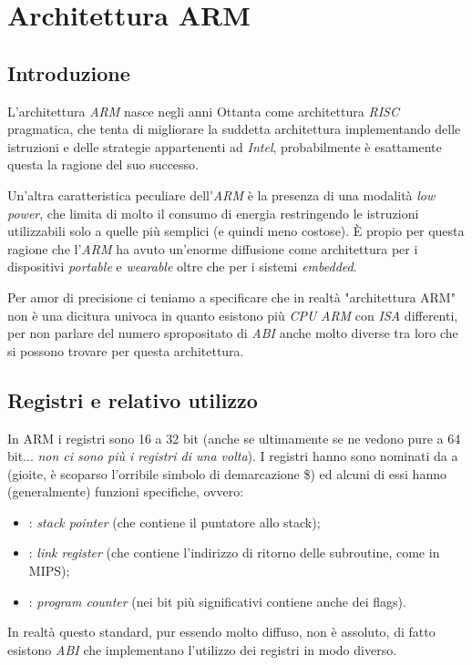 \documentclass[class=book, crop=false, oneside]{standalone}
\begin{document}
\chapter{Architettura ARM}

\section{Introduzione}
L'architettura \emph{ARM} nasce negli anni Ottanta come architettura \emph{RISC} pragmatica, che tenta di migliorare la suddetta architettura implementando delle istruzioni e delle strategie appartenenti ad \emph{Intel}, probabilmente è esattamente questa la ragione del suo successo.

Un'altra caratteristica peculiare dell'\emph{ARM} è la presenza di una modalità \emph{low power}, che limita di molto il consumo di energia restringendo le istruzioni utilizzabili solo a quelle più semplici (e quindi meno costose). È propio per questa ragione che l'\emph{ARM} ha avuto un'enorme diffusione come architettura per i dispositivi \emph{portable} e \emph{wearable} oltre che per i sistemi \emph{embedded}.

Per amor di precisione ci teniamo a specificare che in realtà "architettura ARM" non è una dicitura univoca in quanto esistono più \emph{CPU} \emph{ARM} con \emph{ISA} differenti, per non parlare del numero spropositato di \emph{ABI} anche molto diverse tra loro che si possono trovare per questa architettura.

\section{Registri e relativo utilizzo}
In ARM i registri sono 16 a 32 bit (anche se ultimamente se ne vedono pure a 64 bit... \emph{non ci sono più i registri di una volta}). I registri hanno sono nominati da  a  (gioite, è scoparso l'orribile simbolo di demarcazione \$) ed alcuni di essi hanno (generalmente) funzioni specifiche, ovvero:

\begin{itemize}
	\item {}: \emph{stack pointer} (che contiene il puntatore allo stack);
	\item {}: \emph{link register} (che contiene l'indirizzo di ritorno delle subroutine, come  in MIPS);
	\item {}: \emph{program counter} (nei bit più significativi contiene anche dei flags).
\end{itemize}
In realtà questo standard, pur essendo molto diffuso, non è assoluto, di fatto esistono \emph{ABI} che implementano l'utilizzo dei registri in modo diverso.
\end{document}
